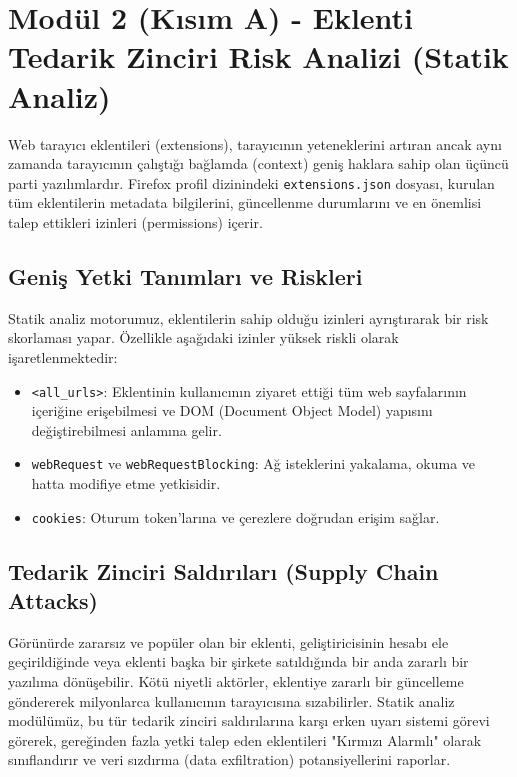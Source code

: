 \documentclass[12pt,a4paper]{article}
\begin{document}
\section{Modül 2 (Kısım A) - Eklenti Tedarik Zinciri Risk Analizi (Statik Analiz)}

Web tarayıcı eklentileri (extensions), tarayıcının yeteneklerini artıran ancak aynı zamanda tarayıcının çalıştığı bağlamda (context) geniş haklara sahip olan üçüncü parti yazılımlardır. Firefox profil dizinindeki \texttt{extensions.json} dosyası, kurulan tüm eklentilerin metadata bilgilerini, güncellenme durumlarını ve en önemlisi talep ettikleri izinleri (permissions) içerir.

\subsection{Geniş Yetki Tanımları ve Riskleri}
Statik analiz motorumuz, eklentilerin sahip olduğu izinleri ayrıştırarak bir risk skorlaması yapar. Özellikle aşağıdaki izinler yüksek riskli olarak işaretlenmektedir:
\begin{itemize}
    \item \texttt{<all\_urls>}: Eklentinin kullanıcının ziyaret ettiği tüm web sayfalarının içeriğine erişebilmesi ve DOM (Document Object Model) yapısını değiştirebilmesi anlamına gelir.
    \item \texttt{webRequest} ve \texttt{webRequestBlocking}: Ağ isteklerini yakalama, okuma ve hatta modifiye etme yetkisidir.
    \item \texttt{cookies}: Oturum token'larına ve çerezlere doğrudan erişim sağlar.
\end{itemize}

\subsection{Tedarik Zinciri Saldırıları (Supply Chain Attacks)}
Görünürde zararsız ve popüler olan bir eklenti, geliştiricisinin hesabı ele geçirildiğinde veya eklenti başka bir şirkete satıldığında bir anda zararlı bir yazılıma dönüşebilir. Kötü niyetli aktörler, eklentiye zararlı bir güncelleme göndererek milyonlarca kullanıcının tarayıcısına sızabilirler. Statik analiz modülümüz, bu tür tedarik zinciri saldırılarına karşı erken uyarı sistemi görevi görerek, gereğinden fazla yetki talep eden eklentileri "Kırmızı Alarmlı" olarak sınıflandırır ve veri sızdırma (data exfiltration) potansiyellerini raporlar.
\clearpage
\end{document}
